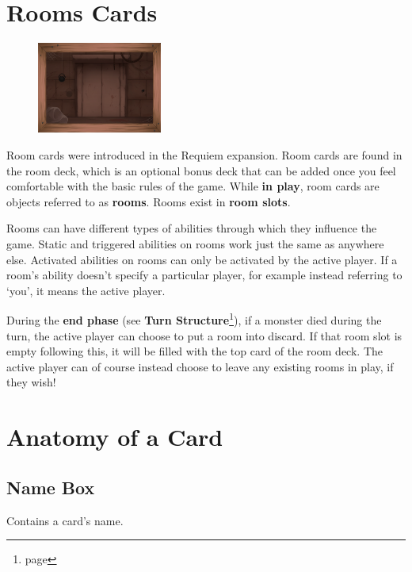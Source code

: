 \documentclass[a4paper, twoside]{report} %
\begin{document}
    \section{Rooms Cards}
    \begin{figure}
        \centering
        \includegraphics[height=30mm]{assets/room.png}
    \end{figure}
    Room cards were introduced in the Requiem expansion. Room cards are found in the room deck, which is an optional bonus deck that can be added once you feel comfortable with the basic rules of the game. While \textbf{in play}, room cards are objects referred to as \textbf{rooms}. Rooms exist in \textbf{room slots}.

    Rooms can have different types of abilities through which they influence the game. Static and triggered abilities on rooms work just the same as anywhere else. Activated abilities on rooms can only be activated by the active player. If a room’s ability doesn’t specify a particular player, for example instead referring to ‘you’, it means the active player.

    During the \textbf{end phase} (see \textbf{Turn Structure}\footnote{page \pageref{turn}}), if a monster died during the turn, the active player can choose to put a room into discard. If that room slot is empty following this, it will be filled with the top card of the room deck. The active player can of course instead choose to leave any existing rooms in play, if they wish!

    \section{Anatomy of a Card}
    \subsection*{Name Box} Contains a card’s name.
\end{document}
